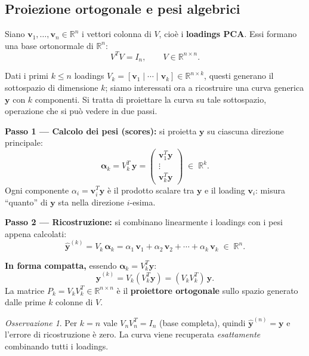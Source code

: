 \documentclass[11pt,a4paper]{article}
\theoremstyle{plain}
\theoremstyle{definition}
\theoremstyle{remark}
\newtheorem*{osservazione}{Osservazione}
\begin{document}
\subsection{Proiezione ortogonale e pesi algebrici}

Siano $\mathbf{v}_1, \ldots, \mathbf{v}_n \in \mathbb{R}^n$ i vettori colonna
di $V$, cioè i
\textbf{loadings PCA}. Essi formano una base ortonormale di $\mathbb{R}^n$:
\[
  V^T V = I_n, \qquad V \in \mathbb{R}^{n \times n}.
\]

Dati i primi $k \leq n$ loadings $V_k = [\mathbf{v}_1 \mid \cdots \mid \mathbf{v}_k]
\in \mathbb{R}^{n \times k}$, questi generano il sottospazio di dimensione $k$; 
siamo interessati ora a ricostruire una curva generica $\mathbf{y}$ con $k$
componenti. Si tratta di proiettare la curva su tale sottospazio, operazione
che si può vedere in due passi.


\textbf{Passo 1 --- Calcolo dei pesi (scores):} si proietta $\mathbf{y}$
su ciascuna direzione principale:
\[
  \boldsymbol{\alpha}_k = V_k^T\,\mathbf{y}
  = \begin{pmatrix} \mathbf{v}_1^T \mathbf{y} \\ \vdots \\ \mathbf{v}_k^T \mathbf{y} \end{pmatrix}
  \;\in\; \mathbb{R}^k.
\]
Ogni componente $\alpha_i = \mathbf{v}_i^T \mathbf{y}$ è il prodotto scalare
tra $\mathbf{y}$ e il loading $\mathbf{v}_i$: misura ``quanto'' di $\mathbf{y}$
sta nella direzione $i$-esima.

\medskip
\textbf{Passo 2 --- Ricostruzione:} si combinano linearmente i loadings
con i pesi appena calcolati:
\[
  \hat{\mathbf{y}}^{(k)} = V_k\,\boldsymbol{\alpha}_k
  = \alpha_1\,\mathbf{v}_1 + \alpha_2\,\mathbf{v}_2 + \cdots + \alpha_k\,\mathbf{v}_k
  \;\in\; \mathbb{R}^n.
\]


\textbf{In forma compatta,} essendo $\boldsymbol{\alpha}_k = V_k^T \mathbf{y}$:
\[
  \hat{\mathbf{y}}^{(k)} = V_k (V_k^T \mathbf{y}) = (V_k V_k^T)\,\mathbf{y}.
\]
La matrice $P_k = V_k V_k^T \in \mathbb{R}^{n \times n}$ è il \textbf{proiettore
ortogonale} sullo spazio generato dalle prime $k$ colonne di $V$.

\begin{osservazione}
Per $k = n$ vale $V_n V_n^T = I_n$ (base completa), quindi
$\hat{\mathbf{y}}^{(n)} = \mathbf{y}$ e l'errore di ricostruzione è zero.
La curva viene recuperata \emph{esattamente} combinando tutti i loadings.
\end{osservazione}
\end{document}
